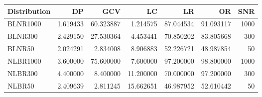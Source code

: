 \begin{tabular}{lrrrrrr}
\toprule
Distribution & DP & GCV & LC & LR & OR & SNR \\
\midrule
BLNR1000 & 1.619433 & 60.323887 & 1.214575 & 87.044534 & 91.093117 & 1000 \\
BLNR300 & 2.429150 & 27.530364 & 4.453441 & 70.850202 & 83.805668 & 300 \\
BLNR50 & 2.024291 & 2.834008 & 8.906883 & 52.226721 & 48.987854 & 50 \\
NLBR1000 & 3.600000 & 75.600000 & 7.600000 & 97.200000 & 98.800000 & 1000 \\
NLBR300 & 4.400000 & 8.400000 & 11.200000 & 70.000000 & 97.200000 & 300 \\
NLBR50 & 2.409639 & 2.811245 & 15.662651 & 46.987952 & 52.610442 & 50 \\
\bottomrule
\end{tabular}
